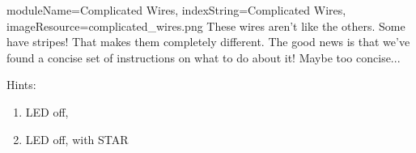 \documentclass{../../ktane-mod}
\begin{document}
\begin{module}{
  moduleName=Complicated Wires,
  indexString=Complicated Wires,
  imageResource=complicated_wires.png
}
{
  These wires aren't like the others. Some have stripes! That makes them completely different. The good news is that we've found a concise set of instructions on what to do about it! Maybe too concise...
}

\newlength{\cellwidth}
\newlength{\cellheight}
\newlength{\cellheightwithoutpadding}
\setlength{\cellwidth}{1cm}
\setlength{\cellheight}{1.13cm}
\setlength{\cellheightwithoutpadding}{1cm}
\newlength{\lastcellwidth}
\setlength{\lastcellwidth}{2.1cm}
\newlength{\fivecellwidth}
\setlength{\fivecellwidth}{5.69cm}
\newlength{\twocellheight}
\setlength{\twocellheight}{2\cellheight}
\newlength{\circleoffset}
\setlength{\circleoffset}{0.20\cellwidth}
\newlength{\staroffset}
\setlength{\staroffset}{0.05\cellwidth}
\newlength{\tablelinewidth}
\setlength{\tablelinewidth}{1pt}

\begin{bulletlist}
\end{bulletlist}

Hints:
\begin{bulletlist}
\end{bulletlist}

\vspace{2cm}

\begin{minipage}[t]{0.48\textwidth}
\begin{enumerate}
  \renewcommand{\labelenumi}{\alph{enumi}.}
  \item LED off, 
  \item LED off, \RED with STAR
\end{enumerate}

\vspace{0.5cm}


\end{minipage}
\end{module}
\end{document}

